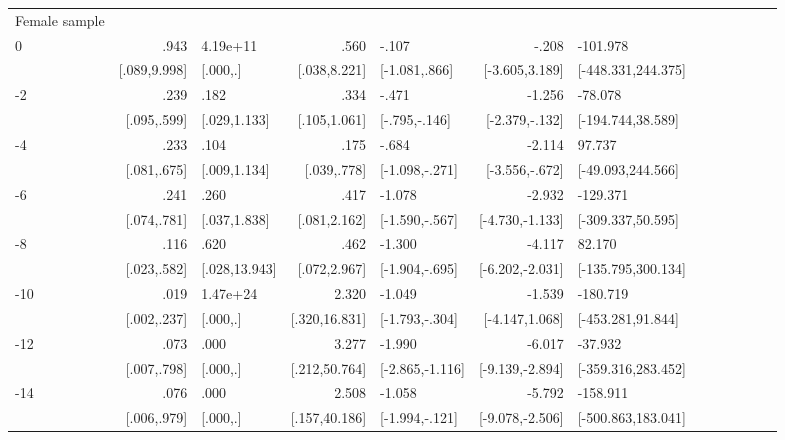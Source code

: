 \begin{table}[h]
\begin{adjustbox}{max width=\linewidth}
\begin{threeparttable}
{\begin{tabular}{l*{6}{D{.}{.}{-1}l}}
\midrule
Female sample &&&&&&\\
0               &            .943&        4.19e+11&            .560&           -.107&           -.208&        -101.978\\
                &    [.089,9.998]&        [.000,.]&    [.038,8.221]&   [-1.081,.866]&  [-3.605,3.189]&[-448.331,244.375]\\
-2             &            .239&            .182&            .334&           -.471&          -1.256&         -78.078\\
                &     [.095,.599]&    [.029,1.133]&    [.105,1.061]&   [-.795,-.146]&  [-2.379,-.132]&[-194.744,38.589]\\
-4             &            .233&            .104&            .175&           -.684&          -2.114&          97.737\\
                &     [.081,.675]&    [.009,1.134]&     [.039,.778]&  [-1.098,-.271]&  [-3.556,-.672]&[-49.093,244.566]\\
-6             &            .241&            .260&            .417&          -1.078&          -2.932&        -129.371\\
                &     [.074,.781]&    [.037,1.838]&    [.081,2.162]&  [-1.590,-.567]& [-4.730,-1.133]&[-309.337,50.595]\\
-8             &            .116&            .620&            .462&          -1.300&          -4.117&          82.170\\
                &     [.023,.582]&   [.028,13.943]&    [.072,2.967]&  [-1.904,-.695]& [-6.202,-2.031]&[-135.795,300.134]\\
-10            &            .019&        1.47e+24&           2.320&          -1.049&          -1.539&        -180.719\\
                &     [.002,.237]&        [.000,.]&   [.320,16.831]&  [-1.793,-.304]&  [-4.147,1.068]&[-453.281,91.844]\\
-12           &            .073&            .000&           3.277&          -1.990&          -6.017&         -37.932\\
                &     [.007,.798]&        [.000,.]&   [.212,50.764]& [-2.865,-1.116]& [-9.139,-2.894]&[-359.316,283.452]\\
-14           &            .076&            .000&           2.508&          -1.058&          -5.792&        -158.911\\
                &     [.006,.979]&        [.000,.]&   [.157,40.186]&  [-1.994,-.121]& [-9.078,-2.506]&[-500.863,183.041]\\

\end{tabular}}
\end{threeparttable}
\end{adjustbox}
\end{table}
